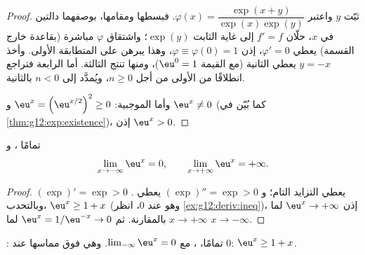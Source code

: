 \begin{proof}
ثبّت $y$ واعتبر $\varphi(x) = \dfrac{\exp(x+y)}{\exp(x)\exp(y)}$. فبسطها
ومقامها، بوصفهما دالتين في $x$، حلّان 
$f' = f$ إلى غاية الثابت $\exp(y)$؛ واشتقاق $\varphi$ مباشرة
(بقاعدة خارج القسمة) يعطي $\varphi' = 0$، إذن
$\varphi \equiv \varphi(0) = 1$، وهذا يبرهن على المتطابقة الأولى. وأخذ
$y = -x$ يعطي الثانية (مع القيمة $\eu^0 = 1$)، ومنها تنتج
الثالثة. أما الرابعة فتراجع انطلاقًا من الأولى من أجل $n \geq 0$، ويُمدَّد
إلى $n < 0$ بالثانية.

وأما الموجبية: $\eu^x = \left(\eu^{x/2}\right)^2 \geq 0$ و $\eu^x \neq 0$
(كما بُيّن في \cref{thm:g12:exp:existence})، إذن $\eu^x > 0$.
\end{proof}

\begin{proposition}\label{prop:g12:exp:variations}
  تمامًا ، و
\[
\lim_{x\to-\infty} \eu^x = 0, \qquad
\lim_{x\to+\infty} \eu^x = +\infty .
\]
\end{proposition}

\begin{proof}
$(\exp)' = \exp > 0$ يعطي التزايد التام؛ و $(\exp)'' = \exp > 0$ يعطي
. وبالتحدب، $\eu^x \geq 1 + x$ (وهو  عند $0$، انظر
\cref{ex:g12:deriv:ineq})، إذن $\eu^x \to +\infty$ لما $x \to +\infty$
بالمقارنة. ثم $\eu^{x} = 1/\eu^{-x} \to 0$ لما $x \to -\infty$.
\end{proof}

\begin{omfigure}

{\small {}:  تمامًا، ، مع
$\lim_{-\infty} \eu^x = 0$. وهي فوق مماسها عند $0$:
$\eu^x \geq 1 + x$.}
\end{omfigure}

